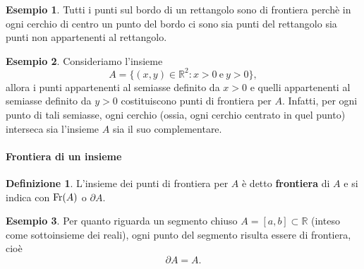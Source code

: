 \documentclass{article}
\theoremstyle{plain}
\theoremstyle{definition}
\newtheorem{defn}{Definizione}[section]
\newtheorem{exmp}{Esempio}[section]
\theoremstyle{remark}
\begin{document}
\vspace{10pt}

\begin{exmp}
    Tutti i punti sul bordo di un rettangolo sono di frontiera perchè in ogni cerchio di centro un punto del bordo ci sono sia punti del rettangolo sia punti non appartenenti al rettangolo.
\end{exmp}

\vspace{10pt}

\begin{exmp}
    Consideriamo l'insieme
    \[ A=\{(x,y)\in\mathbb{R}^2 : x>0 \ \text{e} \ y>0\}, \]
    allora i punti appartenenti al semiasse definito da \(x>0\) e quelli appartenenti al semiasse definito da \(y>0\) costituiscono punti di frontiera per \(A\). 
    Infatti, per ogni punto di tali semiasse, ogni cerchio (ossia, ogni cerchio centrato in quel punto) interseca sia l'insieme \(A\) sia il suo complementare.
\end{exmp}

\vspace{10pt}

\paragraph{Frontiera di un insieme}
\begin{bxthm}
\begin{defn}
    L'insieme dei punti di frontiera per $A$ è detto \textbf{frontiera} di $A$ e si indica con $\textup{Fr}(A)$ o $\partial A$.
\end{defn}
\end{bxthm}

\vspace{10pt}


\vspace{10pt}

\begin{exmp}
    Per quanto riguarda un segmento chiuso \( A = [a,b] \subset \mathbb{R} \) (inteso come sottoinsieme dei reali), ogni punto del segmento risulta essere di frontiera, cioè
    \[
    \partial A = A.
    \]
\end{exmp}
\end{document}
